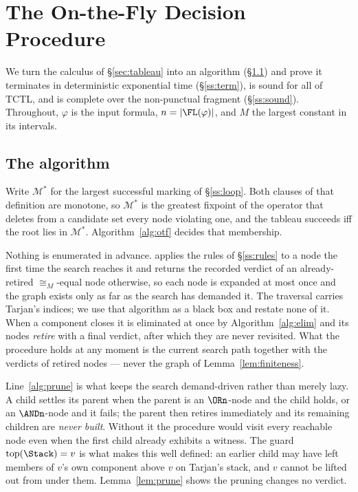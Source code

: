 \section{The On-the-Fly Decision Procedure}\label{sec:correct}

We turn the calculus of \S\ref{sec:tableau} into an algorithm (\S\ref{ss:otf}) and prove it
terminates in deterministic exponential time (\S\ref{ss:term}), is sound for all of TCTL, and is
complete over the non-punctual fragment (\S\ref{ss:sound}). Throughout, $\varphi$ is the input
formula, $n=|\FL(\varphi)|$, and $M$ the largest constant in its intervals.

\subsection{The algorithm}\label{ss:otf}

Write $\mathcal M^{*}$ for the largest successful marking of \S\ref{ss:loop}. Both clauses of that
definition are monotone, so $\mathcal M^{*}$ is the greatest fixpoint of the operator that deletes
from a candidate set every node violating one, and the tableau succeeds iff the root lies in
$\mathcal M^{*}$. Algorithm~\ref{alg:otf} decides that membership.

Nothing is enumerated in advance. \Expand{} applies the rules of \S\ref{ss:rules} to a node the
first time the search reaches it and returns the recorded verdict of an already-retired
$\cong_M$-equal node otherwise, so each node is expanded at most once and the graph exists only as
far as the search has demanded it. The traversal carries Tarjan's indices; we use that algorithm as
a black box and restate none of it. When a component closes it is eliminated at once by
Algorithm~\ref{alg:elim} and its nodes \emph{retire} with a final verdict, after which they are never revisited.
What the procedure holds at any moment is the current search path together with the verdicts of
retired nodes --- never the graph of Lemma~\ref{lem:finiteness}.

Line~\ref{alg:prune} is what keeps the search demand-driven rather than merely lazy. A child settles
its parent when the parent is an $\ORn$-node and the child holds, or an $\ANDn$-node and it fails;
the parent then retires immediately and its remaining children are \emph{never built}. Without it
the procedure would visit every reachable node even when the first child already exhibits a witness.
The guard $\mathrm{top}(\Stack)=v$ is what makes this well defined: an earlier child may have left
members of $v$'s own component above $v$ on Tarjan's stack, and $v$ cannot be lifted out from under
them. Lemma~\ref{lem:prune} shows the pruning changes no verdict.

